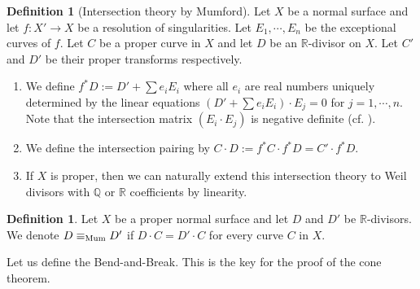 \documentclass[12pt,twoside]{amsart}
\theoremstyle{definition}
\newtheorem{dfn}[thm]{Definition}
\newcommand{\R}{$\mathbb{R}$}
\begin{document}
\begin{dfn}[Intersection theory by Mumford]
Let $X$ be a normal surface and 
let $f: X' \to X$ be a resolution of singularities. 
Let $E_1, \cdots, E_n$ be the exceptional curves of $f$. 
Let $C$ be a proper curve in $X$ and 
let $D$ be an \R-divisor on $X$. 
Let $C'$ and $D'$ be their proper transforms respectively. 
\begin{enumerate}

\item{We define $f^*D:=D'+\sum e_iE_i$ where all $e_i$ are real numbers 
uniquely determined by the linear equations $(D'+\sum e_iE_i)\cdot E_j=0$ for $j=1, \cdots, n$. 
Note that the intersection matrix $(E_i\cdot E_j)$ is negative definite (cf. \cite[Lemma~3.40]{KM}).}

\item{We define the intersection pairing by $C\cdot D:=f^*C\cdot f^*D =C'\cdot f^*D$.}

\item{If $X$ is proper, then we can 
naturally extend this intersection theory to Weil divisors 
with $\mathbb{Q}$ or $\mathbb{R}$ coefficients by linearity.}
\end{enumerate}
\end{dfn}

\begin{dfn}
Let $X$ be a proper normal surface and 
let $D$ and $D'$ be $\mathbb{R}$-divisors. 
We denote $D\equiv_{\rm Mum} D'$ if $D\cdot C=D'\cdot C$ for every curve $C$ in $X$.
\end{dfn}

Let us define the Bend-and-Break. 
This is the key for the proof of the cone theorem. 
\end{document}
